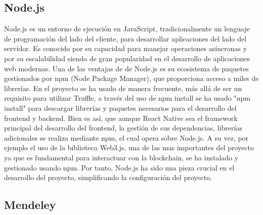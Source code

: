\subsection{Node.js}

Node.js es un entorno de ejecución en JavaScript, tradicionalmente un lenguaje de programación del lado del cliente, para desarrollar aplicaciones del lado del servidor. Es conocido por su capacidad para manejar operaciones asíncronas y por su escalabilidad siendo de gran popularidad en el desarrollo de aplicaciones web modernas. Una de las ventajas de de Node.js es su ecosistema de paquetes gestionados por npm (Node Package Manager), que proporciona acceso a miles de librerías.
En el proyecto se ha usado de manera frecuente, más allá de ser un requisito para utilizar Truffle, a través del uso de npm install se ha usado "npm install" para descargar librerías y paquetes necesarios para el desarrollo del frontend y backend.
Bien es así, que aunque React Native sea el framework principal del desarrollo del frontend, la gestión de sus dependencias, librerías adicionales se realiza mediante npm, el cual opera sobre Node.js.
A su vez, por ejemplo el uso de la biblioteca Web3.js, una de las mas importantes del proyecto ya que es fundamental para interactuar con la blockchain, se ha instalado y gestionado usando npm.
Por tanto, Node.js ha sido una pieza crucial en el desarrollo del proyecto, simplificando la configuración del proyecto.


\subsection{Mendeley}